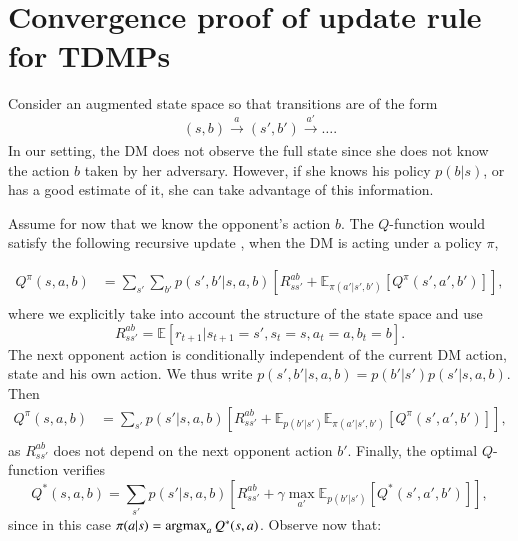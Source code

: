 
\section{Convergence proof of update rule for TDMPs}\label{sec:p}

Consider an augmented state space so that transitions are of the form
$$
 (s,b) \xrightarrow[]{a} (s',b') \xrightarrow[]{a'} \ldots.
$$
In our setting, the DM does not observe the full state since she does
not know the action $b$ taken by her adversary. However, if she knows his policy $p(b|s)$, or has a good estimate of it, she can take advantage of this information.

Assume for now that we know the opponent's action $b$. The $Q$-function would satisfy the following recursive update \cite{sutton2012reinforcement}, when the DM is acting under a policy $\pi$,

\begin{eqnarray*}
Q^\pi (s,a,b) &=  \sum_{s'} \sum_{b'} p(s', b' |s,a,b) \left[ R_{ss'}^{ab} +  \mathbb{E}_{\pi(a'|s',b')} \left[ Q^\pi(s',a',b') \right] \right],\\
\end{eqnarray*}
where we explicitly take into account the structure of the state space and 
use 
$$
R_{ss'}^{ab} = \mathbb{E}\left[ r_{t+1}|s_{t+1} = s', s_{t} = s, a_t = a, b_t = b \right].
$$ 
The next opponent action is conditionally independent of the 
current DM action, state and his own action. We thus write $p(s', b' |s,a,b) = p(b'|s')p(s'|s,a,b)$. Then
\begin{eqnarray*}
Q^\pi (s,a,b) &=  \sum_{s'} p(s'|s,a,b) \left[ R_{ss'}^{ab} +  \mathbb{E}_{p(b'|s')} \mathbb{E}_{\pi(a'|s',b')} \left[ Q^\pi(s',a',b') \right] \right],\\
\end{eqnarray*}
as $R_{ss'}^{ab}$ does not depend on the next opponent action $b'$. Finally, the optimal $Q$-function verifies
$$
Q^*(s,a,b) =  \sum_{s'} p(s'|s,a,b) \left[ R_{ss'}^{ab} + \gamma \max_{a'} \mathbb{E}_{p(b'|s')} \left[ Q^*(s',a',b') \right] \right],
$$
since in this case $\pi(a|s) = \operatorname*{argmax}_a Q^*(s,a)$. Observe now that:

